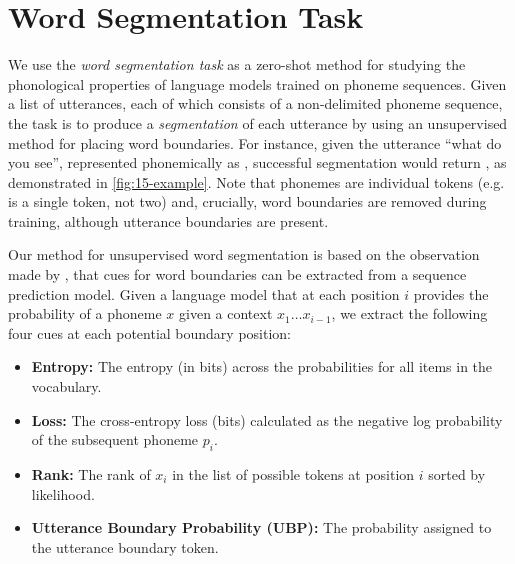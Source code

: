 \section{Word Segmentation Task}


We use the \emph{word segmentation task} as a zero-shot method for studying the phonological properties of language models trained on phoneme sequences. Given a list of utterances, each of which consists of a non-delimited phoneme sequence, the task is to produce a \emph{segmentation} of each utterance by using an unsupervised method for placing word boundaries. For instance, given the utterance ``what do you see'', represented phonemically as , successful segmentation would return , as demonstrated in \cref{fig:15-example}. Note that phonemes are individual tokens (e.g.  is a single token, not two) and, crucially, word boundaries are removed during training, although utterance boundaries are present.

Our method for unsupervised word segmentation is based on the observation made by \citet{elman-1990-finding}, that cues for word boundaries can be extracted from a sequence prediction model. Given a language model that at each position $i$ provides the probability of a phoneme $x$ given a context $x_1\ldots x_{i-1}$, we extract the following four cues at each potential boundary position:


\begin{itemize}[leftmargin=*]
    \item \textbf{Entropy:} The entropy (in bits) across the probabilities for all items in the vocabulary.%
    \item \textbf{Loss:} The cross-entropy loss (bits) calculated as the negative log probability of the subsequent phoneme $p_i$.
    \item \textbf{Rank:} The rank of $x_i$ in the list of possible tokens at position $i$ sorted by likelihood.
    \item \textbf{Utterance Boundary Probability (UBP):} The probability assigned to the utterance boundary token.
\end{itemize}

